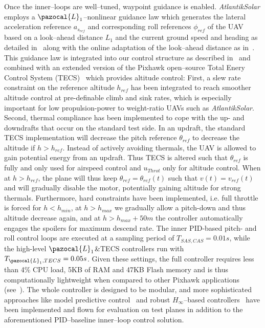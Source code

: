 Once the inner--loops are well--tuned, waypoint guidance is enabled. \textit{AtlantikSolar} employs a $\pazocal{L}_1$--nonlinear guidance law which generates the lateral acceleration reference $a_{s_{ref}}$ and corresponding roll references $\phi_{ref}$ of the UAV based on a look--ahead distance ${L}_1$ and the current ground speed and heading as detailed in~\cite{HOW_L1nav} along with the online adaptation of the look--ahead distance as in~\cite{park2007performance}. This guidance law is integrated into our control structure as described in~\cite{Oettershagen_MED14_L1MPC} and combined with an extended version of the Pixhawk open--source Total Enery Control System (TECS)~\cite{PixhawkWebsite} which provides altitude control: First, a slew rate constraint on the reference altitude $h_{ref}$ has been integrated to reach smoother altitude control at pre-definable climb and sink rates, which is especially important for low propulsion-power to weight-ratio UAVs such as \textit{AtlantikSolar}. Second, thermal compliance has been implemented to cope with the up- and downdrafts that occur on the standard test side. In an updraft, the standard TECS implementation will decrease the pitch reference $\theta_{ref}$ to decrease the altitude if $h>h_{ref}$. Instead of actively avoiding thermals, the UAV is allowed to gain potential energy from an updraft. Thus TECS is altered such that $\theta_{ref}$ is fully and only used for airspeed control and $u_{Throt}$ only for altitude control. When at $h>h_{ref}$, the plane will thus keep $\theta_{ref}=\theta_{ref}(t)$  such that $v(t)=v_{ref}(t)$ and will gradually disable the motor, potentially gaining altitude for strong thermals. Furthermore, hard constraints have been implemented, i.e. full throttle is forced for $h<h_{min}$, at $h>h_{max}$ we gradually allow a pitch-down and thus altitude decrease again, and at $h>h_{max}+50m$ the controller automatically engages the spoilers for maximum descend rate. The inner PID-based pitch- and roll control loops are executed at a sampling period of $T_{SAS,CAS}=0.01s$, while the high-level $\pazocal{L}_1$\&TECS controllers run with $T_{\pazocal{L}_1,TECS}=0.05s$. Given these settings, the full controller requires less than 4\% CPU load, 5KB of RAM and 47KB Flash memory and is thus computationally lightweight when compared to other Pixhawk applications (see~\cite{Oettershagen_MED14_L1MPC}). %
The whole controller is designed to be modular, and more sophisticated approaches like model predictive control~\cite{Oettershagen_MED14_L1MPC} and robust $H_\infty$--based controllers~\cite{Mosimann_FT} have been implemented and flown for evaluation on test planes in addition to the aforementioned PID--baseline inner--loop control solution. 